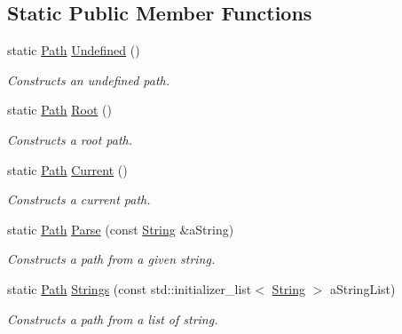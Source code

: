 \subsection*{Static Public Member Functions}
\begin{DoxyCompactItemize}
\item 
static \hyperlink{classlibrary_1_1core_1_1fs_1_1_path}{Path} \hyperlink{classlibrary_1_1core_1_1fs_1_1_path_a0bb46bc56bc1bb180b114bae32477e06}{Undefined} ()
\begin{DoxyCompactList}\small\item\em Constructs an undefined path. \end{DoxyCompactList}\item 
static \hyperlink{classlibrary_1_1core_1_1fs_1_1_path}{Path} \hyperlink{classlibrary_1_1core_1_1fs_1_1_path_a59d9a7b2fcca844a82d22742b5a110ac}{Root} ()
\begin{DoxyCompactList}\small\item\em Constructs a root path. \end{DoxyCompactList}\item 
static \hyperlink{classlibrary_1_1core_1_1fs_1_1_path}{Path} \hyperlink{classlibrary_1_1core_1_1fs_1_1_path_adbdaa4e7ab2a1b399746782668863e53}{Current} ()
\begin{DoxyCompactList}\small\item\em Constructs a current path. \end{DoxyCompactList}\item 
static \hyperlink{classlibrary_1_1core_1_1fs_1_1_path}{Path} \hyperlink{classlibrary_1_1core_1_1fs_1_1_path_a6ba644b6609507e724c217bf2020f5ae}{Parse} (const \hyperlink{classlibrary_1_1core_1_1types_1_1_string}{String} \&a\+String)
\begin{DoxyCompactList}\small\item\em Constructs a path from a given string. \end{DoxyCompactList}\item 
static \hyperlink{classlibrary_1_1core_1_1fs_1_1_path}{Path} \hyperlink{classlibrary_1_1core_1_1fs_1_1_path_a94a2bd454a137249bab970e29a5a95f2}{Strings} (const std\+::initializer\+\_\+list$<$ \hyperlink{classlibrary_1_1core_1_1types_1_1_string}{String} $>$ a\+String\+List)
\begin{DoxyCompactList}\small\item\em Constructs a path from a list of string. \end{DoxyCompactList}\end{DoxyCompactItemize}

